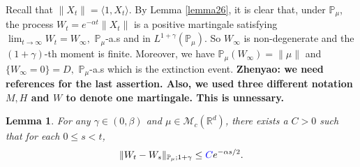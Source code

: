 \documentclass[12pt,oneside,english]{amsart}
\theoremstyle{plain}
\newtheorem{lem}[thm]{Lemma}
\theoremstyle{definition}
\numberwithin{equation}{section}
\newcommand{\added}[1]{{\color{blue}#1}}\newcommand{\deleted}[1]{{\color{red}#1}}
\begin{document}
    Recall that $\|X_t\|=\langle 1,X_t\rangle$.
    By Lemma \ref{lemma26},
    it is clear that,
    under $\mathbb{P}_{\mu}$, the process $W_t=e^{-\alpha t}\|X_t\|$ is a positive martingale satisfying
$\lim_{t\rightarrow \infty} W_t= W_{\infty},$
$\mathbb{P}_{\mu}$-a.s and in $L^{1+\gamma}(\mathbb{P}_{\mu})$. So $W_{\infty}$ is non-degenerate and the $(1+\gamma)$-th moment is finite. Moreover,  we have $\mathbb{P}_{\mu}(W_{\infty})=\|\mu\|$ and $\{W_{\infty}=0\}=D,$ \added{$\mathbb{P}_{\mu}$-a.s} \deleted{which is the extinction event}.
    {\bf Zhenyao: we need references for the last assertion. Also, we used three different notation $M, H$ and $W$ to denote one martingale. This is unnessary.}
\begin{lem}\label{lem: control of Wt}
 For any $\gamma\in (0,\beta)$ and $\mu\in \mathcal M_c(\mathbb R^d)$, there exists a \added{$C> 0$} such that for each $0\leq s<t$,
 $$\|W_t-W_s\|_{\mathbb{P}_{\mu};1+\gamma}\leq \added{C} e^{-\alpha s/2}.$$
\end{lem}
\end{document}
